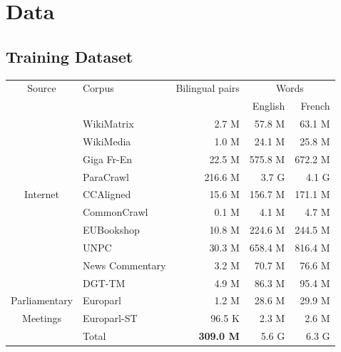 \documentclass[landscape]{article}
\begin{document}
\cp
\section{Data}
\vspace*{10mm}
\subsection*{Training Dataset}
\vspace*{5mm}
\begin{table}[!ht]
\centering
\begin{tabular}{c|l||r|r|r} 
Source&Corpus						&		Bilingual pairs		&		\multicolumn{2}{c}{Words}		\\	
		&					&									&		English			&			French			\\	\hline	
&WikiMatrix				&		2.7 M					&		57.8 M			&			63.1 M			\\ 
&WikiMedia				&		1.0 M					&		24.1 M			&			25.8 M			\\ 
&Giga	Fr-En					&		22.5 M					&		575.8 M		&			672.2 M		\\ 
&ParaCrawl					&		216.6 M				&		3.7 G				&			4.1 G				\\ 
Internet&CCAligned					&		15.6 M					&		156.7 M		&			171.1 M		\\ 
&CommonCrawl			&		0.1 M					&		4.1 M			&			4.7 M		 	\\
&EUBookshop 			&		10.8 M					&		224.6 M		&			244.5 M		\\  
&UNPC						&		30.3 M					&		658.4 M		&			816.4 M		\\ 
&News Commentary 	&		3.2 M					&		70.7 M			&			76.6 M			\\ \hline 
&DGT-TM					&		4.9 M					&		86.3 M			&			95.4 M			\\ 
Parliamentary&Europarl					&		1.2 M					&		28.6 M			&			29.9 M			\\ 
Meetings&Europarl-ST 				&		96.5 K 					&		2.3 M			&			2.6 M 			\\ \hline
&Total							&		\textbf{309.0 M}				&		5.6 G				&			6.3 G				\\ 
\end{tabular}
\end{table}

\end{document}
